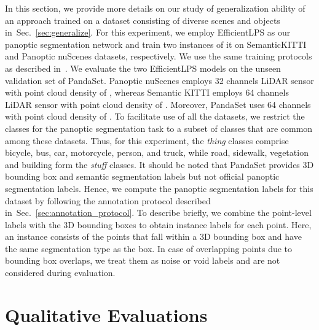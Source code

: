 \documentclass[letterpaper, 10 pt, journal, twoside]{IEEEtran}
\newcommand{\secref}[1]{Sec.~\ref{#1}}
\begin{document}
In this section, we provide more details on our study of generalization ability of an approach trained on a dataset consisting of diverse scenes and objects in~\secref{sec:generalize}. For this experiment, we employ EfficientLPS as our panoptic segmentation network and train two instances of it on SemanticKITTI and Panoptic nuScenes datasets, respectively. We use the same training protocols as described in~\cite{mohan2020efficientps}. We evaluate the two EfficientLPS models on the unseen validation set of PandaSet. Panoptic nuScenes employs 32 channels LiDAR sensor with point cloud density of , whereas Semantic KITTI employs 64 channels LiDAR sensor with point cloud density of . Moreover, PandaSet uses 64 channels with point cloud density of . To facilitate use of all the datasets, we restrict the classes for the panoptic segmentation task to a subset of classes that are common among these datasets. Thus, for this experiment, the \textit{thing} classes comprise bicycle, bus, car, motorcycle, person, and truck, while road, sidewalk, vegetation and building form the \textit{stuff} classes. It should be noted that PandaSet provides 3D bounding box and semantic segmentation labels but not official panoptic segmentation labels. Hence, we compute the panoptic segmentation labels for this dataset by following the annotation protocol described in~\secref{sec:annotation_protocol}. To describe briefly, we combine the point-level labels with the 3D bounding boxes to obtain instance labels for each point. Here, an instance consists of the points that fall within a 3D bounding box and have the same segmentation type as the box. In case of overlapping points due to bounding box overlaps, we treat them as noise or void labels and are not considered during evaluation. 

\section{Qualitative Evaluations}
\end{document}
